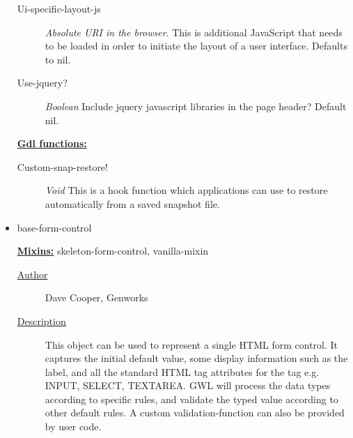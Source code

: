 \documentclass [11pt]{book}
\begin{document}
\begin{itemize}
\begin{description}
\item [Ui-specific-layout-js]
\emph{Absolute URI in the browser}.
This is additional JavaScript that needs to be loaded in order to initiate the layout of a user
interface. Defaults to nil.


\item [Use-jquery?]
\emph{Boolean} Include jquery javascript libraries in the page header?
Default nil.


\end{description}






\textbf{
\underline{Gdl functions:}}

\begin{description}

\item [Custom-snap-restore!]
\emph{Void} This is a hook function which applications can use to restore automatically
from a saved snapshot file.


\end{description}







\item {}base-form-control


\textbf{
\underline{Mixins:}} skeleton-form-control, vanilla-mixin





\begin{description}

\item [
\underline{Author}]


Dave Cooper, Genworks



\item [
\underline{Description}]


This object can be used to represent a single HTML form control. It captures the 
initial default value, some display information such as the label, and all the standard HTML tag attributes
for the tag e.g. INPUT, SELECT, TEXTAREA. GWL will process the data types according to specific rules,
and validate the typed value according to other default rules. A custom validation-function can also 
be provided by user code. 


\end{description}
\end{itemize}
\end{document}

